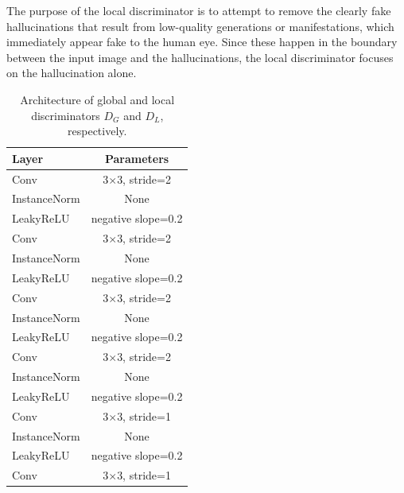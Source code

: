 \documentclass{article}
\begin{document}
The purpose of the local discriminator is to attempt to remove the clearly fake hallucinations that result from low-quality generations or manifestations, which immediately appear fake to the human eye. Since these happen in the boundary between the input image and the hallucinations, the local discriminator focuses on the hallucination alone.

\begin{table}[h] 
  \centering  
    \begin{tabular}{lc}  
    \hline
    \textbf{Layer} & \textbf{Parameters}\\ 
    \hline \hline
      Conv & 3$\times$3, stride=2 \\
    \hline
      InstanceNorm & None \\
    \hline
      LeakyReLU & negative slope=0.2 \\
    \hline
      Conv & 3$\times$3, stride=2 \\
    \hline
      InstanceNorm & None \\
    \hline
      LeakyReLU & negative slope=0.2 \\
    \hline
      Conv & 3$\times$3, stride=2 \\
    \hline
      InstanceNorm & None \\
    \hline
      LeakyReLU & negative slope=0.2 \\
    \hline
      Conv & 3$\times$3, stride=2 \\
    \hline
      InstanceNorm & None \\
    \hline
      LeakyReLU & negative slope=0.2 \\
    \hline
      Conv & 3$\times$3, stride=1 \\
    \hline
      InstanceNorm & None \\
    \hline
      LeakyReLU & negative slope=0.2 \\
    \hline
      Conv & 3$\times$3, stride=1 \\
    \hline
    \end{tabular}
  
  \caption{Architecture of global and local discriminators $D_G$ and $D_L$, respectively.} 
  \label{tab:3}
\end{table}
\end{document}
